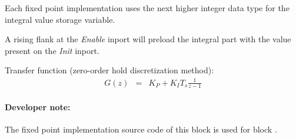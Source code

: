 Each fixed point implementation uses the next higher integer data type for the integral value storage variable.

A rising flank at the \textit{Enable} inport will preload the integral part with the value present on the \textit{Init} inport.
\newline

\noindent
Transfer function (zero-order hold discretization method):
\begin{eqnarray*}
	G(z) &=&  K_{P} + K_{I}T_{s}\frac{1}{z-1}
\end{eqnarray*}

\paragraph{Developer note:} The fixed point implementation source code of this block is used for block .
